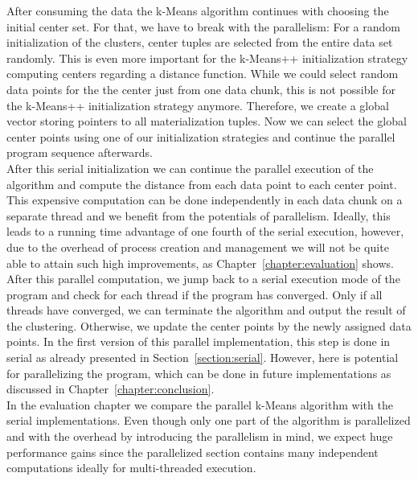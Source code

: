 After consuming the data the k-Means algorithm continues with choosing the initial center set. For that, we have to break with the parallelism: For a random initialization of the clusters, center tuples are selected from the entire data set randomly. This is even more important for the k-Means++ initialization strategy computing centers regarding a distance function. While we could select random data points for the the center just from one data chunk, this is not possible for the k-Means++ initialization strategy anymore. Therefore, we create a global vector storing pointers to all materialization tuples. Now we can select the global center points using one of our initialization strategies and continue the parallel program sequence afterwards.
\\
After this serial initialization we can continue the parallel execution of the algorithm and compute the distance from each data point to each center point. This expensive computation can be done independently in each data chunk on a separate thread and we benefit from the potentials of parallelism. Ideally, this leads to a running time advantage of one fourth of the serial execution, however, due to the overhead of process creation and management we will not be quite able to attain such high improvements, as Chapter~\ref{chapter:evaluation} shows.
\\
After this parallel computation, we jump back to a serial execution mode of the program and check for each thread if the program has converged. Only if all threads have converged, we can terminate the algorithm and output the result of the clustering. Otherwise, we update the center points by the newly assigned data points. In the first version of this parallel implementation, this step is done in serial as already presented in Section~\ref{section:serial}. However, here is potential for parallelizing the program, which can be done in future implementations as discussed in Chapter~\ref{chapter:conclusion}.
\\
In the evaluation chapter we compare the parallel k-Means algorithm with the serial implementations. Even though only one part of the algorithm is parallelized and with the overhead by introducing the parallelism in mind, we expect huge performance gains since the parallelized section contains many independent computations ideally for multi-threaded execution.





